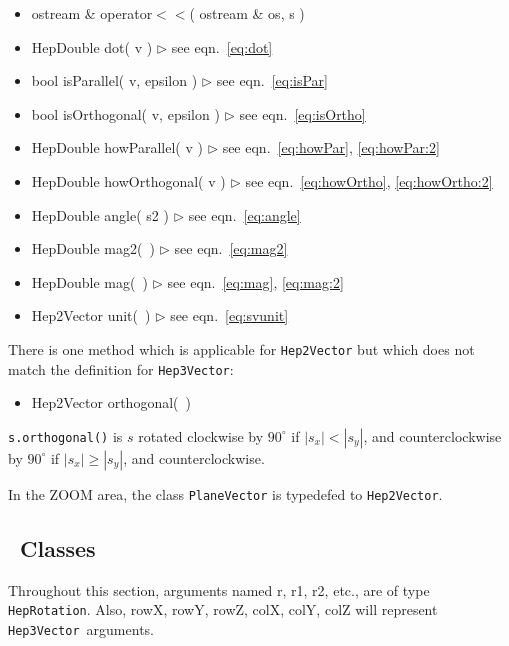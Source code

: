 \documentclass[twoside,12pt]{article}
\def \SV {{\tt Hep3Vector}}
\def \Ro {{\tt HepRotation}}
\newcommand {\see}[1] {\hfill$\triangleright$ see eqn.~#1}
\newenvironment{shortlist}{%
\begin{itemize}
\setlength{\itemsep}{0pt}
\setlength{\parskip}{0pt}
}{%
\end{itemize}
}
\begin{document}
\begin{shortlist}
  \item ostream \& operator$<<$( ostream \& os, s )
\end{shortlist}
\begin{shortlist}
  \item HepDouble dot( v ) \see{\ref{eq:dot}}
  \item bool isParallel( v, epsilon ) \see{\ref{eq:isPar}}
  \item bool isOrthogonal( v, epsilon ) \see{\ref{eq:isOrtho}}
  \item HepDouble howParallel( v ) \see{\ref{eq:howPar}, \ref{eq:howPar:2}}
  \item HepDouble howOrthogonal( v ) \see{\ref{eq:howOrtho}, \ref{eq:howOrtho:2}}
  \item HepDouble angle( s2 ) \see{\ref{eq:angle}}
\end{shortlist}

\begin{shortlist}
  \item HepDouble mag2(~) \see{\ref{eq:mag2}}
  \item HepDouble mag(~) \see{\ref{eq:mag}, \ref{eq:mag:2}}
  \item Hep2Vector unit(~) \see{\ref{eq:svunit}}
\end{shortlist}

\noindent
There is one method which is applicable for {\tt Hep2Vector} but which 
does not match the definition for \SV:

\begin{shortlist}
  \item Hep2Vector orthogonal(~) 
\end{shortlist}

\noindent
\verb$s.orthogonal()$ is $s$ rotated clockwise by $90^\circ$ if 
$|s_x| < |s_y|$, and counterclockwise by $90^\circ$ if 
$|s_x| \geq |s_y|$, and counterclockwise.

\vspace{.16 in}

In the ZOOM area, the class {\tt PlaneVector} is typedefed to 
{\tt Hep2Vector}.

                                   
\subsection{\protect\Ro\ Classes}

Throughout this section, arguments named r, r1, r2, etc., are of type \Ro.
Also, rowX, rowY, rowZ, colX, colY, colZ will represent \SV\ arguments.
\end{document}
